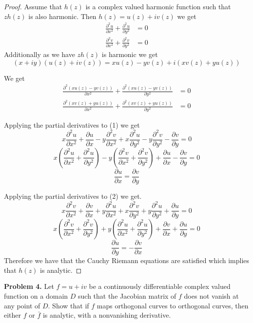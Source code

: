 \documentclass[letter,12pt]{article}
\begin{document}
    \begin{proof}
        Assume that $h(z)$ is a complex valued harmonic function such that $zh(z)$ is also harmonic. Then $h(z)=u(z)+iv(z)$ we get \begin{align*}
            \frac{\partial^2 u}{\partial x^2}+\frac{\partial^2 u}{\partial y^2 } & =0 \\ \frac{\partial^2 v}{\partial x^2}+\frac{\partial ^2 v}{\partial y^2} & =0
        \end{align*} 
        Additionally as we have $zh(z)$ is harmonic we get $$(x+iy)(u(z)+iv(z))=xu(z)-yv(z) +i(xv(z)+yu(z))$$
         
        We get \begin{align}
            \frac{\partial ^2(xu(z)-yv(z))}{\partial x^2}+\frac{\partial ^2 (xu(z)-yv(z))}{\partial y^2} &=0 \\ \frac{\partial ^2(xv(z)+yu(z))}{\partial x^2}+\frac{\partial ^2 (xv(z)+yu(z))}{\partial y^2} &=0
        \end{align}

        Applying the partial derivatives to (1) we get 
        \[
            x\frac{\partial ^2 u}{\partial x^2}+ \frac{\partial u}{\partial x}-y\frac{\partial^2 v}{\partial x^2}+ x\frac{\partial ^2 u}{\partial y^2}- y\frac{\partial ^2 v}{\partial y^2}- \frac{\partial v}{\partial y}=0
        \]
        \[
            x(\frac{\partial^2 u}{\partial x^2}+\frac{\partial ^2 u}{\partial y^2})-y(\frac{\partial ^2 v}{\partial x^2}+\frac{\partial ^2 v}{\partial y^2})+ \frac{\partial u}{\partial x}-\frac{\partial v}{\partial y}=0
        \]
        \[
            \frac{\partial u}{\partial x}=\frac{\partial v}{\partial y}
        \]
        
        Applying the partial derivatives to (2) we get.
        \[
            x\frac{\partial ^2 v}{\partial x^2}+ \frac{\partial v}{\partial x}+ y\frac{\partial ^2 u}{\partial x^2 } + x\frac{\partial ^2 v}{\partial y^2}+y\frac{\partial ^2u}{\partial y^2}+ \frac{\partial u}{\partial y}=0
        \] 
        \[
            x(\frac{\partial ^2 v}{\partial x^2}+\frac{\partial ^2 v}{\partial y^2})+y(\frac{\partial ^2 u}{\partial x^2}+\frac{\partial^2 u}{\partial y^2})+\frac{\partial v}{\partial x}+\frac{\partial u}{\partial y}=0
        \]
        \[
            \frac{\partial u}{\partial y}=-\frac{\partial v}{\partial x}
        \]
        Therefore we have that the Cauchy Riemann equations are satisfied which implies that $h(z)$ is analytic.
    \end{proof}
    \begin{tcolorbox}
    \textbf{Problem 4.}
    Let $f=u+iv$ be a continuously differentiable complex valued function on a domain $D$ such that the Jacobian matrix of $f$ does not vanish at any point of $D$. Show that if $f$ maps orthogonal curves to orthogonal curves, then either $f$ or $\bar f$ is analytic, with a nonvanishing derivative.
    \end{tcolorbox}
\end{document}
